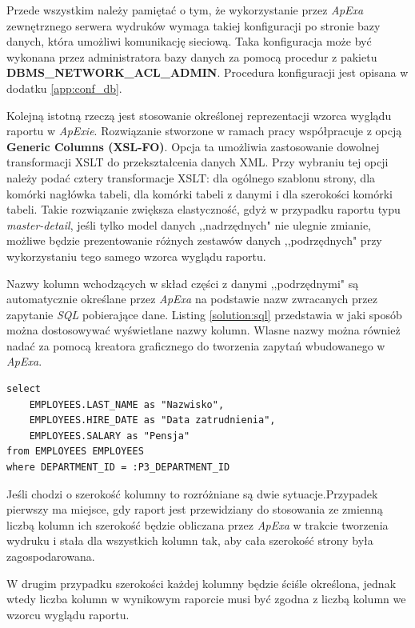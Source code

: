 \documentclass[11pt,a4paper]{article}
\begin{document}
Przede wszystkim należy pamiętać o tym, że wykorzystanie przez \emph{ApExa} zewnętrznego serwera wydruków wymaga takiej konfiguracji po stronie bazy danych, która umożliwi komunikację sieciową. Taka konfiguracja może być wykonana przez administratora bazy danych za pomocą procedur z pakietu \textbf{DBMS\_NETWORK\_ACL\_ADMIN}. Procedura konfiguracji jest opisana w dodatku \ref{app:conf_db}.

Kolejną istotną rzeczą jest stosowanie określonej reprezentacji wzorca wyglądu raportu w \emph{ApExie}. Rozwiązanie stworzone w ramach pracy współpracuje z opcją \textbf{Generic Columns (XSL-FO)}. Opcja ta umożliwia zastosowanie dowolnej transformacji XSLT do przekształcenia danych XML. Przy wybraniu tej opcji należy podać cztery transformacje XSLT: dla ogólnego szablonu strony, dla komórki nagłówka tabeli, dla komórki tabeli z danymi i dla szerokości komórki tabeli.
Takie rozwiązanie zwiększa elastyczność, gdyż w przypadku raportu typu \emph{master-detail}, jeśli tylko model danych ,,nadrzędnych" nie ulegnie zmianie, możliwe będzie prezentowanie różnych zestawów danych ,,podrzędnych" przy wykorzystaniu tego samego wzorca wyglądu raportu. 

Nazwy kolumn wchodzących w skład części z danymi ,,podrzędnymi" są automatycznie określane przez \emph{ApExa} na podstawie nazw zwracanych przez zapytanie \emph{SQL} pobierające dane. Listing \ref{solution:sql} przedstawia w jaki sposób można dostosowywać wyświetlane nazwy kolumn. Wlasne nazwy można również nadać za pomocą kreatora graficznego do tworzenia zapytań wbudowanego w \emph{ApExa}.
 
\lstset{language=SQL}
\begin{lstlisting}[frame=single,caption=Przykładowe zapytanie \emph{SQL},label=solution:sql]
select
    EMPLOYEES.LAST_NAME as "Nazwisko",
    EMPLOYEES.HIRE_DATE as "Data zatrudnienia",
    EMPLOYEES.SALARY as "Pensja"
from EMPLOYEES EMPLOYEES
where DEPARTMENT_ID = :P3_DEPARTMENT_ID
\end{lstlisting}

Jeśli chodzi o szerokość kolumny to rozróżniane są dwie sytuacje.Przypadek pierwszy ma miejsce, gdy raport jest przewidziany do stosowania ze zmienną liczbą kolumn ich szerokość będzie obliczana przez \emph{ApExa} w trakcie tworzenia wydruku i stała dla wszystkich kolumn tak, aby cała szerokość strony była zagospodarowana. 

W drugim przypadku szerokości każdej kolumny będzie ściśle określona, jednak wtedy liczba kolumn w wynikowym raporcie musi być zgodna z liczbą kolumn we wzorcu wyglądu raportu. 
\end{document}
